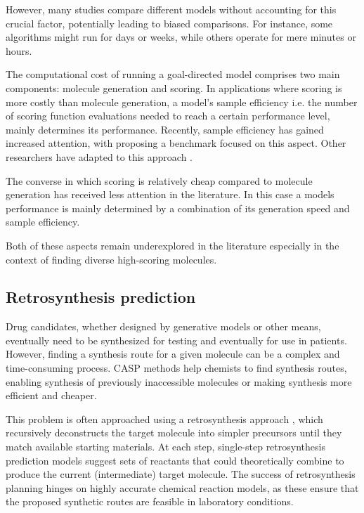 However, many studies compare different models without
accounting for this crucial factor, potentially leading to biased comparisons. For instance, some
algorithms might run for days or weeks, while others operate for mere minutes or hours.

The computational cost of running a goal-directed model comprises two main components: molecule
generation and scoring. In applications where scoring is more costly than molecule generation, a
model's sample efficiency i.e. the number of scoring function evaluations needed to reach a certain
performance level, mainly determines its performance. Recently, sample efficiency has gained
increased attention, with \citep{gaoSampleEfficiencyMatters2022} proposing a benchmark focused on
this aspect. Other researchers have adapted to this approach
\citep{thomasReevaluatingSampleEfficiency2022,thomasAugmentedHillClimbIncreases2022,guoAugmentedMemoryCapitalizing2023}.

The converse in which scoring is relatively cheap compared to molecule generation
has received less attention in the literature. In this case a models performance
is mainly determined by a combination of its generation speed and sample efficiency.

Both of these aspects remain underexplored in the literature especially in the context of
finding diverse high-scoring molecules.

\subsection{Retrosynthesis prediction}
Drug candidates, whether designed by generative models or other means, eventually need to be
synthesized for testing and eventually for use in patients. However, finding a synthesis route for a
given molecule can be a complex and time-consuming process. \Ac{CASP} methods help
chemists to find synthesis routes, enabling synthesis of previously inaccessible molecules or making
synthesis more efficient and cheaper.

This problem is often approached using a retrosynthesis approach
\citep{coreyComputerAssistedDesignComplex1969,coreyLogicChemicalSynthesis1991a}, which
recursively deconstructs the target molecule into simpler precursors until they match available
starting materials. At each step, single-step retrosynthesis prediction models suggest sets of
reactants that could theoretically combine to produce the current (intermediate) target molecule.
The success of retrosynthesis planning hinges on highly accurate chemical reaction models, as these
ensure that the proposed synthetic routes are feasible in laboratory conditions.

